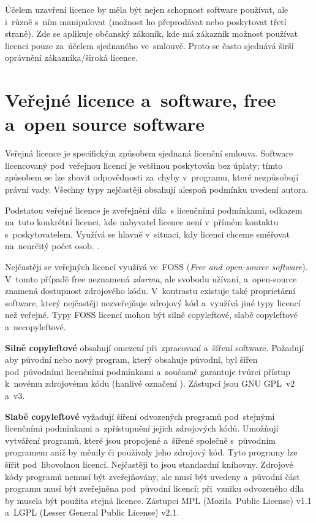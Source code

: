 Účelem uzavření licence by měla být nejen schopnost software používat, ale i~různě s~ním manipulovat (možnost ho přeprodávat nebo poskytovat třetí straně). Zde se aplikuje občanský zákoník, kde má zákazník možnost používat licenci pouze za~účelem sjednaného ve~smlouvě. Proto se často sjednává širší oprávnění zákazníka/široká licence.

\clearpage
\section{Veřejné licence a~software, free a~open source software}

Veřejná licence je specifickým způsobem sjednaná licenční smlouva. Software licencovaný pod~veřejnou licencí je vetšinou poskytován bez úplaty; tímto způsobem se lze zbavit odpovědnosti za~chyby v~programu, které nezpůsobují právní vady. Všechny typy nejčastěji obsahují alespoň podmínku uvedení autora.

Podstatou veřejné licence je zveřejnění díla~s licenčními podmínkami, odkazem na~tuto konkrétní licenci, kde nabyvatel licence není v~přímém kontaktu s~poskytovatelem. Využívá se hlavně v~situaci, kdy licenci chceme směřovat na~neurčitý počet osob. \emph{}.

Nejčastěji se veřejných licencí využívá ve~FOSS (\emph{Free and open-source software}). V~tomto případě free neznamená \emph{zdarma}, ale svobodu užívaní, a~open-source znamená dostupnost zdrojového kódu. V~kontrastu existuje také proprietární software, který nejčastěji nezveřejňuje zdrojový kód a~využívá jiné typy licencí než veřejné. Typy FOSS licencí mohou být silně copyleftové, slabě copyleftové a~necopyleftové.

\textbf{Silně copyleftové} obsahují omezení při~zpracovaní a~šíření software. Požadují aby původní nebo nový program, který obsahuje původní, byl šířen pod~původními licenčními podmínkami a~současně garantuje tvůrci přístup k~novému zdrojovému kódu (hanlivé označení ). Zástupci jsou GNU GPL~v2 a~v3.

\textbf{Slabě copyleftové} vyžadují šíření odvozených programů pod~stejnými licenčními podmínkami a~zpřístupnění jejich zdrojových kódů. Umožňují vytváření programů, které jsou propojené a~šířené společně s~původním programem aniž by měnily či používaly jeho zdrojový kód. Tyto programy lze šířit pod~libovolnou licencí. Nejčastěji to jsou standardní knihovny. Zdrojové kódy programů nemusí být zveřejňovány, ale musí být uvedeny a~původní část programu musí být zveřejněna pod~původní licencí; při~vzniku odvozeného díla by musela být použita stejná licence. Zástupci MPL (Mozila~Public License) v1.1 a~LGPL (Lesser General Public License) v2.1.

